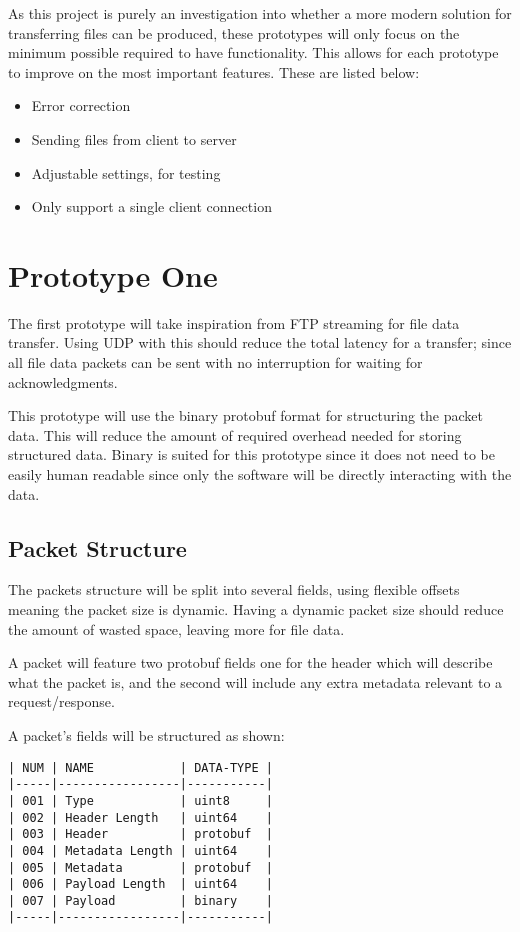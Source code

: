 As this project is purely an investigation into whether a more modern solution for transferring files can be produced, these prototypes will only focus on the minimum possible required to have functionality. This allows for each prototype to improve on the most important features. These are listed below:

\begin{itemize}
	\item Error correction
	\item Sending files from client to server
	\item Adjustable settings, for testing
	\item Only support a single client connection
\end{itemize}


\section{Prototype One}
The first prototype will take inspiration from FTP streaming for file data transfer. Using UDP with this should reduce the total latency for a transfer; since all file data packets can be sent with no interruption for waiting for acknowledgments.

This prototype will use the binary protobuf format for structuring the packet data. This will reduce the amount of required overhead needed for storing structured data. Binary is suited for this prototype since it does not need to be easily human readable since only the software will be directly interacting with the data.

\subsection*{Packet Structure}
The packets structure will be split into several fields, using flexible offsets meaning the packet size is dynamic. Having a dynamic packet size should reduce the amount of wasted space, leaving more for file data.

A packet will feature two protobuf fields one for the header which will describe what the packet is, and the second will include any extra metadata relevant to a request/response.

A packet's fields will be structured as shown:

\begin{lstlisting}[float,caption=Prototype One Packet Fields]
| NUM | NAME            | DATA-TYPE |
|-----|-----------------|-----------|
| 001 | Type            | uint8     |
| 002 | Header Length   | uint64    |
| 003 | Header          | protobuf  |
| 004 | Metadata Length | uint64    |
| 005 | Metadata        | protobuf  |
| 006 | Payload Length  | uint64    |
| 007 | Payload         | binary    |
|-----|-----------------|-----------|
\end{lstlisting}

